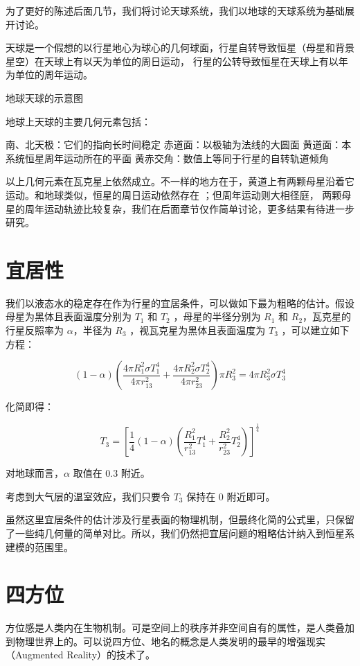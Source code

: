 \documentclass[a4paper,10.5pt]{book}
\begin{document}
为了更好的陈述后面几节，我们将讨论天球系统，我们以地球的天球系统为基础展开讨论。

天球是一个假想的以行星地心为球心的几何球面，行星自转导致恒星（母星和背景星空）在天球上有以天为单位的周日运动，
行星的公转导致恒星在天球上有以年为单位的周年运动。

地球天球的示意图

地球上天球的主要几何元素包括：

南、北天极：它们的指向长时间稳定
赤道面：以极轴为法线的大圆面
黄道面：本系统恒星周年运动所在的平面
黄赤交角：数值上等同于行星的自转轨道倾角

以上几何元素在瓦克星上依然成立。不一样的地方在于，黄道上有两颗母星沿着它运动。和地球类似，恒星的周日运动依然存在 ；但周年运动则大相径庭，
两颗母星的周年运动轨迹比较复杂，我们在后面章节仅作简单讨论，更多结果有待进一步研究。

\section{宜居性}

我们以液态水的稳定存在作为行星的宜居条件，可以做如下最为粗略的估计。假设母星为黑体且表面温度分别为 $T_1$ 和 $T_2$ ，母星的半径分别为 $R_1$ 和 $R_2$，瓦克星的行星反照率为 $\alpha$，半径为 $R_3$ ，视瓦克星为黑体且表面温度为 $T_3$  ，可以建立如下方程：

$$\left ( 1 - \alpha \right ) \left(  \frac{4 \pi R_1^2 \sigma T_1^4} {4 \pi r_{13}^2} + \frac{4 \pi R_2^2 \sigma T_2^4} {4 \pi r_{23}^2} \right ) \pi R_3^2= 4 \pi R_3^2 \sigma T_3^4$$

化简即得：

$$T_3 = \left[ \frac{1}{4} \left( 1 - \alpha \right ) \left( \frac{R_1^2}{r_{13}^2} T_1^4 + \frac{R_2^2}{r_{23}^2} T_2^4 \right ) \right ]^{\frac{1}{4}}$$

对地球而言，$\alpha$ 取值在 0.3 附近。

考虑到大气层的温室效应，我们只要令 $T_3$ 保持在 0 附近即可。

虽然这里宜居条件的估计涉及行星表面的物理机制，但最终化简的公式里，只保留了一些纯几何量的简单对比。所以，我们仍然把宜居问题的粗略估计纳入到恒星系建模的范围里。

\section{四方位}

方位感是人类内在生物机制。可是空间上的秩序并非空间自有的属性，是人类叠加到物理世界上的。可以说四方位、地名的概念是人类发明的最早的增强现实（Augmented Reality）的技术了。
\end{document}

